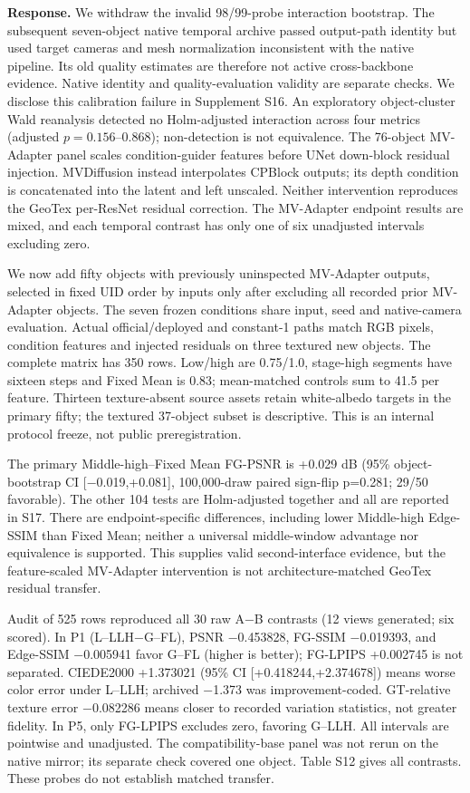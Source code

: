 \documentclass[
  10pt,
]{article}
\begin{document}
\textbf{Response.} We withdraw the invalid 98/99-probe interaction
bootstrap. The subsequent seven-object native temporal archive passed
output-path identity but used target cameras and mesh normalization
inconsistent with the native pipeline. Its old quality estimates are
therefore not active cross-backbone evidence. Native identity and
quality-evaluation validity are separate checks. We disclose this
calibration failure in Supplement S16. An exploratory object-cluster
Wald reanalysis detected no Holm-adjusted interaction across four
metrics (adjusted \(p=0.156\)--\(0.868\)); non-detection is not
equivalence. The 76-object MV-Adapter panel scales condition-guider
features before UNet down-block residual injection. MVDiffusion instead
interpolates CPBlock outputs; its depth condition is concatenated into
the latent and left unscaled. Neither intervention reproduces the GeoTex
per-ResNet residual correction. The MV-Adapter endpoint results are
mixed, and each temporal contrast has only one of six unadjusted
intervals excluding zero.

We now add fifty objects with previously uninspected MV-Adapter outputs,
selected in fixed UID order by inputs only after excluding all recorded
prior MV-Adapter objects. The seven frozen conditions share input, seed
and native-camera evaluation. Actual official/deployed and constant-1
paths match RGB pixels, condition features and injected residuals on
three textured new objects. The complete matrix has 350 rows. Low/high
are 0.75/1.0, stage-high segments have sixteen steps and Fixed Mean is
0.83; mean-matched controls sum to 41.5 per feature. Thirteen
texture-absent source assets retain white-albedo targets in the primary
fifty; the textured 37-object subset is descriptive. This is an internal
protocol freeze, not public preregistration.

The primary Middle-high--Fixed Mean FG-PSNR is +0.029 dB (95\%
object-bootstrap CI {[}−0.019,+0.081{]}, 100,000-draw paired sign-flip
p=0.281; 29/50 favorable). The other 104 tests are Holm-adjusted
together and all are reported in S17. There are endpoint-specific
differences, including lower Middle-high Edge-SSIM than Fixed Mean;
neither a universal middle-window advantage nor equivalence is
supported. This supplies valid second-interface evidence, but the
feature-scaled MV-Adapter intervention is not architecture-matched
GeoTex residual transfer.

Audit of 525 rows reproduced all 30 raw A−B contrasts (12 views
generated; six scored). In P1 (L--LLH−G--FL), PSNR −0.453828, FG-SSIM
−0.019393, and Edge-SSIM −0.005941 favor G--FL (higher is better);
FG-LPIPS +0.002745 is not separated. CIEDE2000 +1.373021 (95\% CI
{[}+0.418244,+2.374678{]}) means worse color error under L--LLH;
archived −1.373 was improvement-coded. GT-relative texture error
−0.082286 means closer to recorded variation statistics, not greater
fidelity. In P5, only FG-LPIPS excludes zero, favoring G--LLH. All
intervals are pointwise and unadjusted. The compatibility-base panel was
not rerun on the native mirror; its separate check covered one object.
Table S12 gives all contrasts. These probes do not establish matched
transfer.
\end{document}
